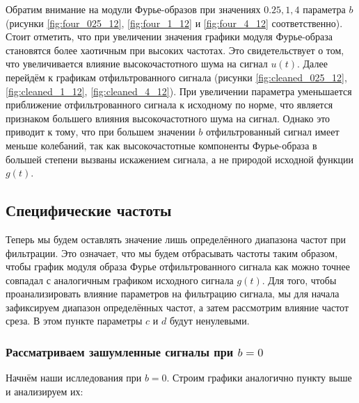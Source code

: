 Обратим внимание на модули Фурье-образов при значениях $0.25, 1, 4$ параметра $b$ (рисунки \ref{fig:four_025_12}, \ref{fig:four_1_12} и \ref{fig:four_4_12} соответственно). Стоит отметить, что при увеличении значения графики модуля Фурье-образа становятся более хаотичным при высоких частотах. Это свидетельствует о том, что увеличивается влияние высокочастотного шума на сигнал $u(t)$. Далее перейдём к графикам отфильтрованного сигнала (рисунки \ref{fig:cleaned_025_12}, \ref{fig:cleaned_1_12}, \ref{fig:cleaned_4_12}). При увеличении параметра уменьшается приближение отфильтрованного сигнала к исходному по норме, что является признаком большего влияния высокочастотного шума на сигнал. Однако это приводит к тому, что при большем значении $b$ отфильтрованный сигнал имеет меньше колебаний, так как высокочастотные компоненты Фурье-образа в большей степени вызваны искажением сигнала, а не природой исходной функции $g(t)$. 

\clearpage
\subsection{Специфические частоты}

Теперь мы будем оставлять значение лишь определённого диапазона частот при фильтрации. Это означает, что мы будем отбрасывать частоты таким образом, чтобы график модуля образа Фурье отфильтрованного сигнала как можно точнее совпадал с аналогичным графиком исходного сигнала $g(t)$. Для того, чтобы проанализировать влияние параметров на фильтрацию сигнала, мы для начала зафиксируем диапазон определённых частот, а затем рассмотрим влияние частот среза. В этом пункте параметры $c$ и $d$ будут ненулевыми.

\subsubsection{Рассматриваем зашумленные сигналы при $b=0$}\label{b_0}

Начнём наши ислледования при $b=0$. Строим графики аналогично пункту выше и анализируем их:

